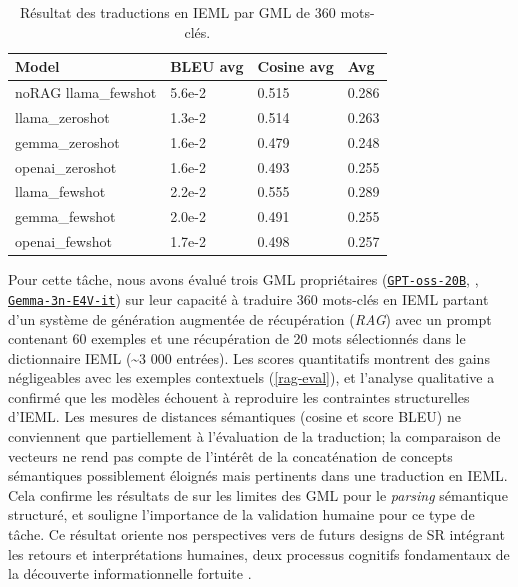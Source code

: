 \documentclass[final,fra]{anthology-ch} %
\begin{document}
\begin{table}[h]
\centering
\begin{tabular}{llll}
\toprule
\textbf{Model} & \textbf{BLEU avg} & \textbf{Cosine avg} & \textbf{Avg} \\
\midrule
noRAG llama\_fewshot & 5.6e-2 & 0.515 & 0.286 \\
llama\_zeroshot      & 1.3e-2 & 0.514 & 0.263 \\
gemma\_zeroshot      & 1.6e-2 & 0.479 & 0.248 \\
openai\_zeroshot     & 1.6e-2 & 0.493 & 0.255 \\
llama\_fewshot       & 2.2e-2 & 0.555 & 0.289 \\
gemma\_fewshot       & 2.0e-2 & 0.491 & 0.255 \\
openai\_fewshot      & 1.7e-2 & 0.498 & 0.257 \\
\bottomrule
\end{tabular}
\caption{Résultat des traductions en IEML par GML de 360 mots-clés.}
\label{tab:resultats}
\end{table}

\protect{}\label{rag-eval}{}

Pour cette tâche, nous avons évalué trois GML propriétaires
(\href{https://huggingface.co/openai/gpt-oss-20b}{\texttt{GPT-oss-20B}}, 
\href{https://huggingface.co/meta-llama/Meta-Llama-3-70B-Instruct}{\texttt{}}, 
\href{https://huggingface.co/google/gemma-3n-E4B-it}{\texttt{Gemma-3n-E4V-it}})
sur leur capacité à traduire 360 mots-clés en IEML partant d'un système
de génération augmentée de récupération (\emph{RAG}) avec un prompt
contenant 60 exemples et une récupération de 20 mots sélectionnés dans
le dictionnaire IEML (\textasciitilde3 000 entrées). Les scores
quantitatifs montrent des gains négligeables avec les exemples
contextuels (\hyperref[rag-eval]{{[}rag-eval{]}}), et l'analyse
qualitative a confirmé que les modèles échouent à reproduire les
contraintes structurelles d'IEML. Les mesures de distances sémantiques
(cosine et score BLEU) ne conviennent que partiellement à l'évaluation
de la traduction; la comparaison de vecteurs ne rend pas compte de
l'intérêt de la concaténation de concepts sémantiques possiblement
éloignés mais pertinents dans une traduction en IEML. Cela confirme les
résultats de \autocite{ettingerYouAreExpert2023} sur les limites des GML
pour le \emph{parsing} sémantique structuré, et souligne l'importance de
la validation humaine pour ce type de tâche. Ce résultat oriente nos
perspectives vers de futurs designs de SR intégrant les retours et
interprétations humaines, deux processus cognitifs fondamentaux de la
découverte informationnelle fortuite
\autocite{makriComingInformationSerendipitously2012}.
\end{document}
